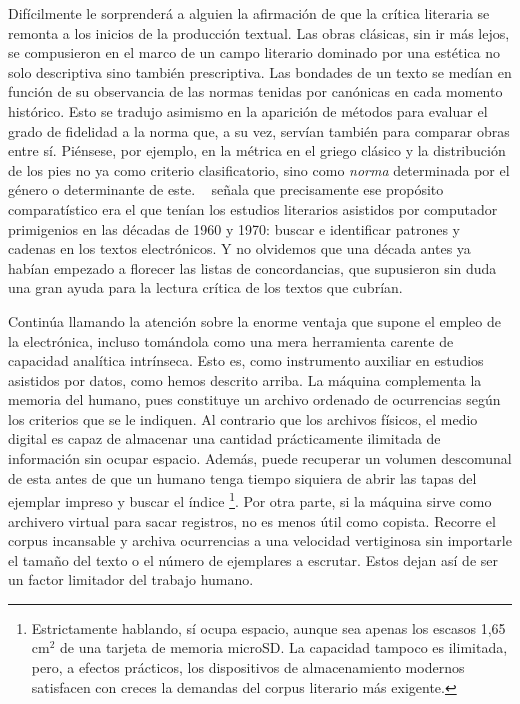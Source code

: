Difícilmente le sorprenderá a alguien la afirmación de que la crítica literaria se remonta a los inicios de la producción textual. Las obras clásicas, sin ir más lejos, se compusieron en el marco de un campo literario dominado por una estética no solo descriptiva sino también prescriptiva. Las bondades de un texto se medían en función de su observancia de las normas tenidas por canónicas en cada momento histórico. Esto se tradujo asimismo en la aparición de métodos para evaluar el grado de fidelidad a la norma que, a su vez, servían también para comparar obras entre sí. Piénsese, por ejemplo, en la métrica en el griego clásico y la distribución de los pies no ya como criterio clasificatorio, sino como \textit{norma} determinada por el género o determinante de este. \citeauthor{rommel2004}~\parencite*[88-89]{rommel2004} señala que precisamente ese propósito comparatístico era el que tenían los estudios literarios asistidos por computador primigenios en las décadas de 1960 y 1970: buscar e identificar patrones y cadenas en los textos electrónicos. Y no olvidemos que una década antes ya habían empezado a florecer las listas de concordancias, que supusieron sin duda una gran ayuda para la lectura crítica de los textos que cubrían.

Continúa \citeauthor{rommel2004} llamando la atención sobre la enorme ventaja que supone el empleo de la electrónica, incluso tomándola como una mera herramienta carente de capacidad analítica intrínseca. Esto es, como instrumento auxiliar en estudios asistidos por datos, como hemos descrito arriba. La máquina complementa la memoria del humano, pues constituye un archivo ordenado de ocurrencias según los criterios que se le indiquen. Al contrario que los archivos físicos, el medio digital es capaz de almacenar una cantidad prácticamente ilimitada de información sin ocupar espacio. Además, puede recuperar un volumen descomunal de esta antes de que un humano tenga tiempo siquiera de abrir las tapas del ejemplar impreso y buscar el índice \footnote{Estrictamente hablando, sí ocupa espacio, aunque sea apenas los escasos 1,65 cm${}^{2}$ de una tarjeta de memoria microSD. La capacidad tampoco es ilimitada, pero, a efectos prácticos, los dispositivos de almacenamiento modernos satisfacen con creces la demandas del corpus literario más exigente.}. Por otra parte, si la máquina sirve como archivero virtual para sacar registros, no es menos útil como copista. Recorre el corpus incansable y archiva ocurrencias a una velocidad vertiginosa sin importarle el tamaño del texto o el número de ejemplares a escrutar. Estos dejan así de ser un factor limitador del trabajo humano. 

